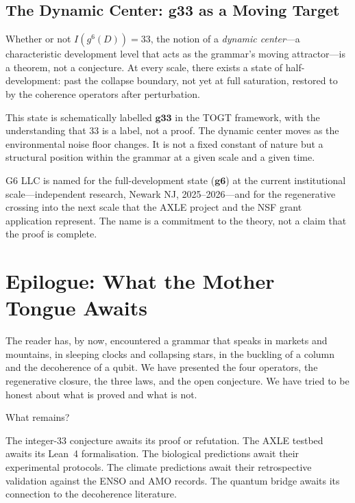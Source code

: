 \documentclass[12pt, oneside]{book}
\theoremstyle{plain}
\theoremstyle{definition}
\theoremstyle{remark}
\begin{document}
\section{The Dynamic Center: g33 as a Moving Target}

Whether or not $I(g^6(D)) = 33$, the notion of a \emph{dynamic
center}---a characteristic development level that acts as the
grammar's moving attractor---is a theorem, not a conjecture.
At every scale, there exists a state of half-development: past
the collapse boundary, not yet at full saturation, restored
to by the coherence operators after perturbation.

This state is schematically labelled $\mathbf{g33}$ in the
TOGT framework, with the understanding that 33 is a label, not
a proof. The dynamic center moves as the environmental noise
floor changes. It is not a fixed constant of nature but a
structural position within the grammar at a given scale and
a given time.

G6 LLC is named for the full-development state ($\mathbf{g6}$)
at the current institutional scale---independent research,
Newark NJ, 2025--2026---and for the regenerative crossing
into the next scale that the AXLE project and the NSF grant
application represent. The name is a commitment to the theory,
not a claim that the proof is complete.

\chapter*{Epilogue: What the Mother Tongue Awaits}

The reader has, by now, encountered a grammar that speaks in
markets and mountains, in sleeping clocks and collapsing stars,
in the buckling of a column and the decoherence of a qubit.
We have presented the four operators, the regenerative closure,
the three laws, and the open conjecture. We have tried to be
honest about what is proved and what is not.

What remains?

The integer-33 conjecture awaits its proof or refutation.
The AXLE testbed awaits its Lean~4 formalisation. The biological
predictions await their experimental protocols. The climate
predictions await their retrospective validation against
the ENSO and AMO records. The quantum bridge awaits its
connection to the decoherence literature.
\end{document}
